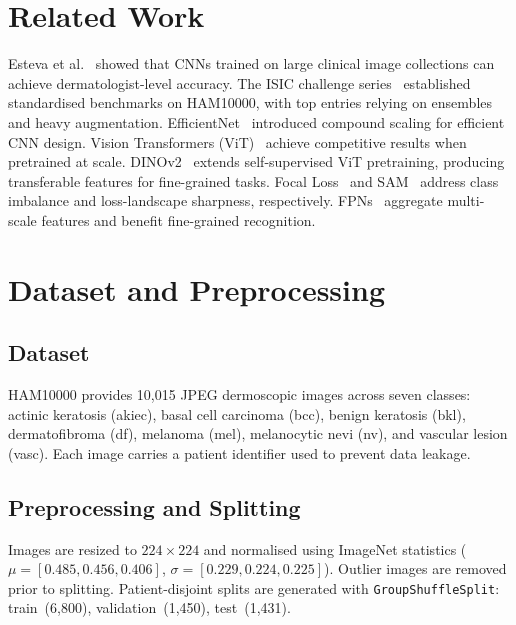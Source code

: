\documentclass[10pt,twocolumn]{article}
\begin{document}
\section{Related Work}
\label{sec:related}

Esteva et al.~\cite{esteva2017dermatologist} showed that CNNs trained on large clinical image collections can achieve dermatologist-level accuracy. The ISIC challenge series~\cite{codella2018skin} established standardised benchmarks on HAM10000, with top entries relying on ensembles and heavy augmentation. EfficientNet~\cite{tan2019efficientnet} introduced compound scaling for efficient CNN design. Vision Transformers (ViT)~\cite{dosovitskiy2020vit} achieve competitive results when pretrained at scale. DINOv2~\cite{oquab2023dinov2} extends self-supervised ViT pretraining, producing transferable features for fine-grained tasks. Focal Loss~\cite{lin2017focal} and SAM~\cite{foret2021sam} address class imbalance and loss-landscape sharpness, respectively. FPNs~\cite{lin2017fpn} aggregate multi-scale features and benefit fine-grained recognition.

\section{Dataset and Preprocessing}
\label{sec:data}

\subsection{Dataset}
HAM10000 provides 10,015 JPEG dermoscopic images across seven classes: actinic keratosis (akiec), basal cell carcinoma (bcc), benign keratosis (bkl), dermatofibroma (df), melanoma (mel), melanocytic nevi (nv), and vascular lesion (vasc). Each image carries a patient identifier used to prevent data leakage.

\subsection{Preprocessing and Splitting}
Images are resized to $224\times224$ and normalised using ImageNet statistics ($\mu=[0.485, 0.456, 0.406]$, $\sigma=[0.229, 0.224, 0.225]$). Outlier images are removed prior to splitting. Patient-disjoint splits are generated with \texttt{GroupShuffleSplit}: train~(6,800), validation~(1,450), test~(1,431).
\end{document}
